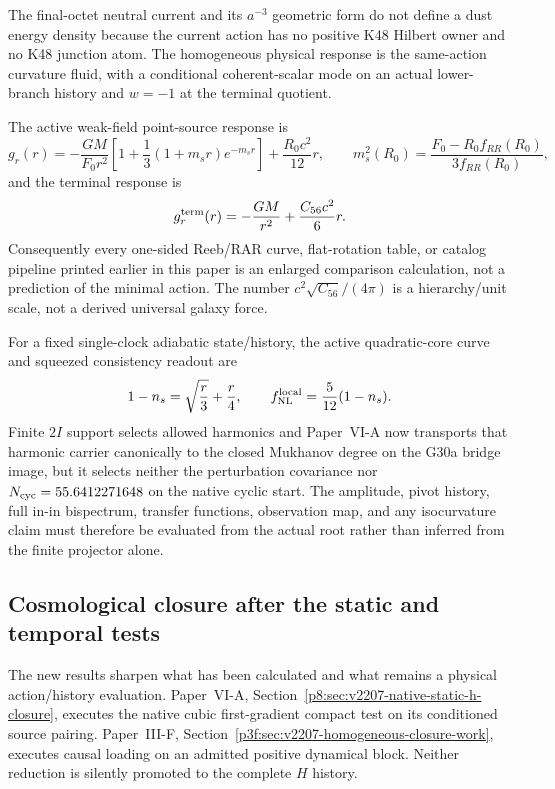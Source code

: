 \documentclass[12pt,a4paper]{article}
\begin{document}
\begin{theorem}
\label{p9:thm:v164-k48-rar-readout-correction}
The final-octet neutral current and its \(a^{-3}\) geometric form do not define
a dust energy density because the current action has no positive K48 Hilbert
owner and no K48 junction atom.  The homogeneous physical response is the
same-action curvature fluid, with a conditional coherent-scalar mode on an
actual lower-branch history and \(w=-1\) at the terminal quotient.

The active weak-field point-source response is
\[
 g_r(r)=-\frac{GM}{F_0r^2}
 \left[1+\frac13(1+m_sr)e^{-m_sr}\right]
 +\frac{R_0c^2}{12}r,
 \qquad m_s^2(R_0)=\frac{F_0-R_0f_{RR}(R_0)}{3f_{RR}(R_0)},
\]
and the terminal response is
\[
 g_r^{\rm term}(r)=-\frac{GM}{r^2}+\frac{C_{56}c^2}{6}r.
\]
Consequently every one-sided Reeb/RAR curve, flat-rotation table, or catalog
pipeline printed earlier in this paper is an enlarged comparison calculation,
not a prediction of the minimal action.  The number
\(c^2\sqrt{C_{56}}/(4\pi)\) is a hierarchy/unit scale, not a derived universal
galaxy force.
\end{theorem}

\begin{theorem}
\label{p9:thm:v164-perturbation-readout-boundary}
For a fixed single-clock adiabatic state/history, the active quadratic-core
curve and squeezed consistency readout are
\[
 1-n_s=\sqrt{\frac r3}+\frac r4,
 \qquad
 f_{\rm NL}^{\rm local}=\frac5{12}(1-n_s).
\]
Finite \(2I\) support selects allowed harmonics and Paper~VI-A now transports
that harmonic carrier canonically to the closed Mukhanov degree on the G30a
bridge image, but it selects neither the perturbation covariance nor
\(N_{\rm cyc}=55.6412271648\) on the native cyclic start.  The amplitude, pivot history, full in-in bispectrum, transfer
functions, observation map, and any isocurvature claim must therefore be
evaluated from the actual root rather than inferred from the finite projector
alone.
\end{theorem}

\subsection{Cosmological closure after the static and temporal tests}
\label{p9:sec:v2207-cosmological-closure-contract}

The new results sharpen what has been calculated and what remains a
physical action/history evaluation. Paper~VI-A,
Section~\ref{p8:sec:v2207-native-static-h-closure}, executes the native
cubic first-gradient compact test on its conditioned source pairing.
Paper~III-F, Section~\ref{p3f:sec:v2207-homogeneous-closure-work},
executes causal loading on an admitted positive dynamical block.
Neither reduction is silently promoted to the complete $H$ history.
\end{document}
